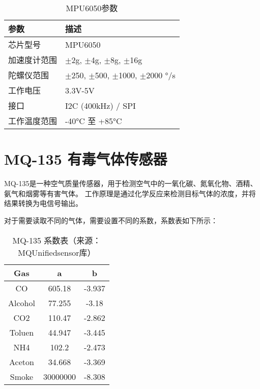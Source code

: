 \begin{table} [H]
    \centering
    \begin{tabular}{|l|l|}
    \hline
    \textbf{参数}                     & \textbf{描述}                                \\ \hline
    芯片型号                           & MPU6050                                      \\ \hline
    加速度计范围                       & $\pm$2g, $\pm$4g, $\pm$8g, $\pm$16g          \\ \hline
    陀螺仪范围                         & $\pm$250, $\pm$500, $\pm$1000, $\pm$2000 °/s \\ \hline
    工作电压                           & 3.3V-5V                                      \\ \hline
    接口                               & I2C (400kHz) / SPI                           \\ \hline
    工作温度范围                       & -40°C 至 +85°C                                \\ \hline
    \end{tabular}
    \caption{MPU6050参数}
    \label{tab:MPU6050参数}
\end{table}

\section{MQ-135 有毒气体传感器}

MQ-135是一种空气质量传感器，用于检测空气中的一氧化碳、氮氧化物、酒精、氨气和烟雾等有害气体。
工作原理是通过化学反应来检测目标气体的浓度，并将结果转换为电信号输出。

对于需要读取不同的气体，需要设置不同的系数，系数表如下所示：

\begin{table} [H]
    \centering
    \begin{tabular}{|c|c|c|}
    \hline
    \textbf{Gas} & \textbf{a} & \textbf{b} \\
    \hline
    CO & 605.18 & -3.937 \\
    \hline
    Alcohol & 77.255 & -3.18 \\
    \hline
    CO2 & 110.47 & -2.862 \\
    \hline
    Toluen & 44.947 & -3.445 \\
    \hline
    NH4 & 102.2 & -2.473 \\
    \hline
    Aceton & 34.668 & -3.369 \\
    \hline
    Smoke & 30000000 & -8.308 \\
    \hline
    \end{tabular}
    \caption{MQ-135 系数表（来源：MQUnifiedsensor库）}
    \label{tab:MQ-135系数表}
\end{table}

